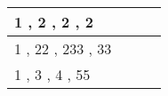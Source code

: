 \begin{tabular}{| l | l | l | l |} \hline
1 , 2 , 2 , 2\\ \hline
1 , 22 , 233 , 33\\ \hline
1 , 3 , 4 , 55\\ \hline
\end{tabular}
